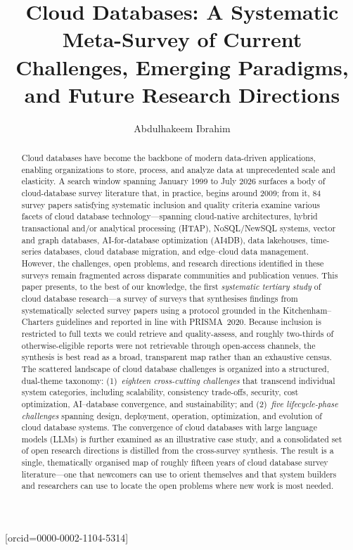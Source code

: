 \documentclass[a4paper,fleqn]{cas-sc}
\begin{document}
\let\WriteBookmarks\relax


\title[mode=title]{Cloud Databases: A Systematic Meta-Survey of Current Challenges, Emerging Paradigms, and Future Research Directions}

\author[1]{Abdulhakeem Ibrahim}[orcid=0000-0002-1104-5314]
\cormark[1]



\begin{abstract}
Cloud databases have become the backbone of modern data-driven applications, enabling organizations to store, process, and analyze data at unprecedented scale and elasticity. A search window spanning January 1999 to July 2026 surfaces a body of cloud-database survey literature that, in practice, begins around 2009; from it, 84 survey papers satisfying systematic inclusion and quality criteria examine various facets of cloud database technology---spanning cloud-native architectures, hybrid transactional and/or analytical processing (HTAP), NoSQL/NewSQL systems, vector and graph databases, AI-for-database optimization (AI4DB), data lakehouses, time-series databases, cloud database migration, and edge--cloud data management. However, the challenges, open problems, and research directions identified in these surveys remain fragmented across disparate communities and publication venues. This paper presents, to the best of our knowledge, the first \emph{systematic tertiary study} of cloud database research---a survey of surveys that synthesises findings from systematically selected survey papers using a protocol grounded in the Kitchenham--Charters guidelines and reported in line with PRISMA~2020. Because inclusion is restricted to full texts we could retrieve and quality-assess, and roughly two-thirds of otherwise-eligible reports were not retrievable through open-access channels, the synthesis is best read as a broad, transparent map rather than an exhaustive census. The scattered landscape of cloud database challenges is organized into a structured, dual-theme taxonomy: (1)~\emph{eighteen cross-cutting challenges} that transcend individual system categories, including scalability, consistency trade-offs, security, cost optimization, AI--database convergence, and sustainability; and (2)~\emph{five lifecycle-phase challenges} spanning design, deployment, operation, optimization, and evolution of cloud database systems. The convergence of cloud databases with large language models (LLMs) is further examined as an illustrative case study, and a consolidated set of open research directions is distilled from the cross-survey synthesis. The result is a single, thematically organised map of roughly fifteen years of cloud database survey literature---one that newcomers can use to orient themselves and that system builders and researchers can use to locate the open problems where new work is most needed.
\end{abstract}
\end{document}
